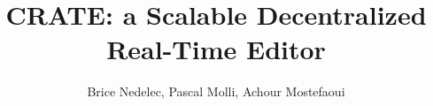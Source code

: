 \documentclass{sig-alternate}
\begin{document}
\title{CRATE: a Scalable Decentralized Real-Time Editor}

\author{
     \alignauthor Brice Nedelec, Pascal Molli, Achour Mostefaoui\\
     \\
     \\
}

\maketitle














\raggedright


% 
% 
\end{document}
